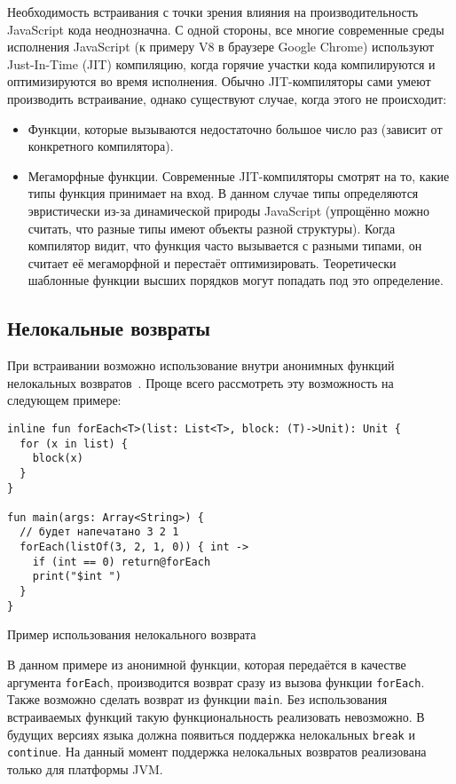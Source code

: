 Необходимость встраивания с точки зрения влияния
на производительность JavaScript кода неоднозначна.
С одной стороны, все многие современные среды исполнения
JavaScript (к примеру V8 в браузере Google Chrome)
используют Just-In-Time (JIT) компиляцию, когда горячие
участки кода компилируются и оптимизируются во
время исполнения. Обычно JIT-компиляторы
сами умеют производить встраивание, однако
существуют случае, когда этого не происходит:
\begin{itemize}
  \item Функции, которые вызываются недостаточно большое число раз (зависит
  от конкретного компилятора).
  \item Мегаморфные функции. Современные JIT-компиляторы смотрят
  на то, какие типы функция принимает на вход. В данном случае типы
  определяются эвристически из-за динамической природы JavaScript
  (упрощённо можно считать, что разные типы имеют объекты разной структуры).
  Когда компилятор видит, что функция часто вызывается с разными типами,
  он считает её мегаморфной и перестаёт оптимизировать.
  Теоретически шаблонные функции высших порядков могут попадать
  под это определение.

\end{itemize}

\subsection{Нелокальные возвраты}

При встраивании возможно использование внутри анонимных функций
нелокальных возвратов~\cite{NONLOCAL_RETURN}. Проще всего рассмотреть эту возможность на следующем примере:
\begin{listing}[H]
\begin{verbatim}
inline fun forEach<T>(list: List<T>, block: (T)->Unit): Unit {
  for (x in list) {
    block(x)
  }
}

fun main(args: Array<String>) {
  // будет напечатано 3 2 1
  forEach(listOf(3, 2, 1, 0)) { int ->
    if (int == 0) return@forEach
    print("$int ")
  }
}
\end{verbatim}
\caption{Пример использования нелокального возврата}
\end{listing}

В данном примере из анонимной функции, которая передаётся в качестве
аргумента \texttt{forEach}, производится возврат сразу из вызова
функции \texttt{forEach}. Также возможно сделать возврат из функции \texttt{main}.
Без использования встраиваемых функций такую функциональность
реализовать невозможно. В будущих версиях языка
должна появиться поддержка нелокальных
\texttt{break} и \texttt{continue}.
На данный момент поддержка нелокальных возвратов реализована только
для платформы JVM.

